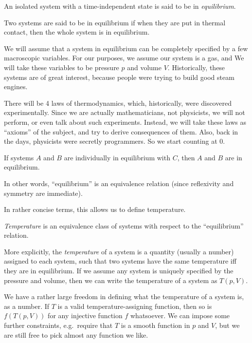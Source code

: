 \documentclass[a4paper]{article}
\begin{document}
\begin{defi}[Equilibrium]
  An isolated system with a time-independent state is said to be in \emph{equilibrium}.

  Two systems are said to be in equilibrium if when they are put in thermal contact, then the whole system is in equilibrium.
\end{defi}

We will assume that a system in equilibrium can be completely specified by a few macroscopic variables. For our purposes, we assume our system is a gas, and We will take these variables to be pressure $p$ and volume $V$. Historically, these systems are of great interest, because people were trying to build good steam engines.

There will be 4 laws of thermodynamics, which, historically, were discovered experimentally. Since we are actually mathematicians, not physicists, we will not perform, or even talk about such experiments. Instead, we will take these laws as ``axioms'' of the subject, and try to derive consequences of them. Also, back in the days, physicists were secretly programmers. So we start counting at $0$.

\begin{law}
  If systems $A$ and $B$ are individually in equilibrium with $C$, then $A$ and $B$ are in equilibrium.
\end{law}
In other words, ``equilibrium'' is an equivalence relation (since reflexivity and symmetry are immediate).

In rather concise terms, this allows us to define temperature.
\begin{defi}[Temperature]
  \emph{Temperature} is an equivalence class of systems with respect to the ``equilibrium'' relation.
\end{defi}
More explicitly, the \emph{temperature} of a system is a quantity (usually a number) assigned to each system, such that two systems have the same temperature iff they are in equilibrium. If we assume any system is uniquely specified by the pressure and volume, then we can write the temperature of a system as $T(p, V)$.

We have a rather large freedom in defining what the temperature of a system is, as a number. If $T$ is a valid temperature-assigning function, then so is $f(T(p, V))$ for any injective function $f$ whatsoever. We can impose some further constraints, e.g.\ require that $T$ is a smooth function in $p$ and $V$, but we are still free to pick almost any function we like.
\end{document}

